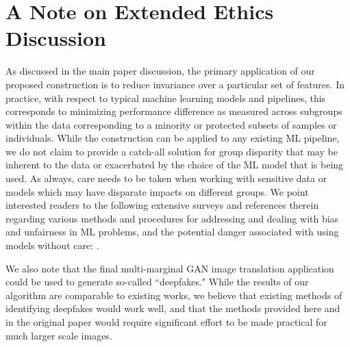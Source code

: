 \section{A Note on Extended Ethics Discussion}

As discussed in the main paper discussion,
the primary application of our proposed construction is to reduce invariance over a particular set of features. In practice, with respect to typical machine learning models and pipelines, 
this corresponds to minimizing performance difference as measured across subgroups within the data corresponding to a minority or protected subsets of samples or individuals.
While the construction can be applied to 
any existing ML pipeline,
we do not claim to provide a catch-all solution for group disparity that may be inherent to the data or exacerbated by the choice of the ML model that is being used.
As always, care needs to be taken when working with sensitive data or models which may have disparate impacts on different groups.
We point interested readers to the following extensive surveys and references therein regarding various methods and procedures for addressing and dealing with bias and unfairness in ML problems, and the potential danger associated with using models without care: \citep{mehrabi2021survey,leavy2018gender,o2016weapons,d2017conscientious,rakova2021responsible}.

We also note that the final multi-marginal GAN image translation application could be used to generate so-called ``deepfakes." 
While the results of our algorithm are comparable to existing works, we believe that existing methods of identifying deepfakes would work well, and that the methods provided here and in the original  paper \cite{cao2019multi} would require significant effort to be made practical for much larger scale images.